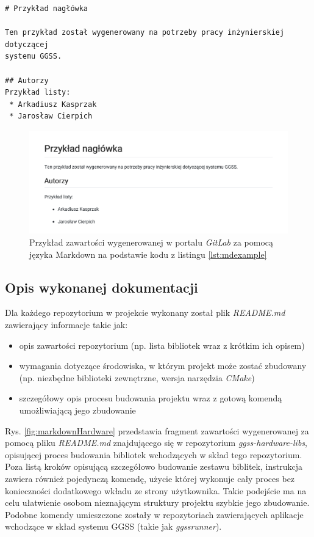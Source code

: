 \begin{lstlisting}[caption={Przykład prostego pliku napisanego w języku Markdown}, label={lst:mdexample}]
# Przykład nagłówka

Ten przykład został wygenerowany na potrzeby pracy inżynierskiej dotyczącej 
systemu GGSS.

## Autorzy
Przykład listy:
 * Arkadiusz Kasprzak
 * Jarosław Cierpich
\end{lstlisting}

\begin{figure}[H]
\centering
\caption{Przykład zawartości wygenerowanej w portalu \textit{GitLab} za pomocą języka Markdown na podstawie kodu z listingu \ref{lst:mdexample}}
\label{fig:markdownExample}
\includegraphics[width=\textwidth]{res/MarkdownExample}
\end{figure}


\subsection{Opis wykonanej dokumentacji}
Dla każdego repozytorium w projekcie wykonany został plik \textit{README.md} zawierający informacje takie jak:
\begin{itemize}
\item opis zawartości repozytorium (np. lista bibliotek wraz z krótkim ich opisem)
\item wymagania dotyczące środowiska, w którym projekt może zostać zbudowany (np. niezbędne biblioteki zewnętrzne, wersja narzędzia \textit{CMake})
\item szczegółowy opis procesu budowania projektu wraz z gotową komendą umożliwiającą jego zbudowanie 
\end{itemize}

Rys. \ref{fig:markdownHardware} przedstawia fragment zawartości wygenerowanej za pomocą pliku \textit{README.md} znajdującego się w repozytorium \textit{ggss-hardware-libs}, opisującej proces budowania bibliotek wchodzących w skład tego repozytorium. Poza listą kroków opisującą szczegółowo budowanie zestawu biblitek, instrukcja zawiera również pojedynczą komendę, użycie której wykonuje cały proces bez konieczności dodatkowego wkładu ze strony użytkownika. Takie podejście ma na celu ułatwienie osobom nieznającym struktury projektu szybkie jego zbudowanie. Podobne komendy umieszczone zostały w repozytoriach zawierających aplikacje wchodzące w skład systemu GGSS (takie jak \textit{ggssrunner}).

